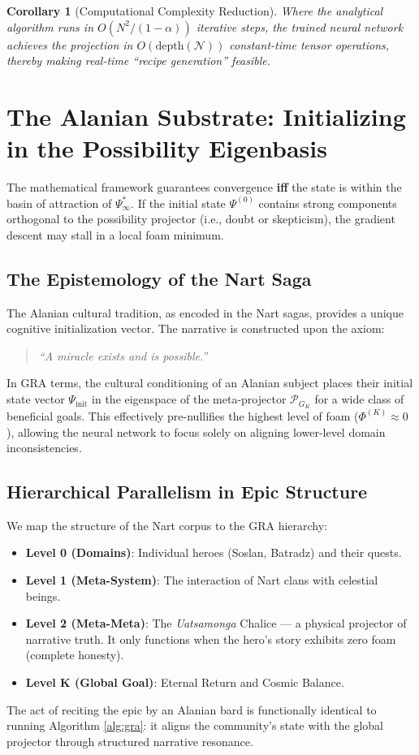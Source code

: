 \documentclass[11pt]{article}
\newtheorem{corollary}[theorem]{Corollary}
\newcommand{\pena}{\Phi}
\newcommand{\proj}{\mathcal{P}}
\newcommand{\state}{\Psi}
\newcommand{\vacuum}{\state_{\infty}^*}
\begin{document}
\begin{corollary}[Computational Complexity Reduction]
Where the analytical algorithm runs in \(O(N^2 / (1-\alpha))\) iterative steps, the trained neural network achieves the projection in \(O(\text{depth}(\mathcal{N}))\) constant-time tensor operations, thereby making real-time ``recipe generation'' feasible.
\end{corollary}

\section{The Alanian Substrate: Initializing in the Possibility Eigenbasis}
The mathematical framework guarantees convergence \textbf{iff} the state is within the basin of attraction of \(\vacuum\). If the initial state \(\state^{(0)}\) contains strong components orthogonal to the possibility projector (i.e., doubt or skepticism), the gradient descent may stall in a local foam minimum.

\subsection{The Epistemology of the Nart Saga}
The Alanian cultural tradition, as encoded in the Nart sagas, provides a unique cognitive initialization vector. The narrative is constructed upon the axiom:
\begin{quote}
\textit{``A miracle exists and is possible.''}
\end{quote}

In GRA terms, the cultural conditioning of an Alanian subject places their initial state vector \(\state_{\text{init}}\) in the eigenspace of the meta-projector \(\proj_{G_K}\) for a wide class of beneficial goals. This effectively pre-nullifies the highest level of foam (\(\pena^{(K)} \approx 0\)), allowing the neural network to focus solely on aligning lower-level domain inconsistencies.

\subsection{Hierarchical Parallelism in Epic Structure}
We map the structure of the Nart corpus to the GRA hierarchy:
\begin{itemize}
    \item \textbf{Level 0 (Domains)}: Individual heroes (Soslan, Batradz) and their quests.
    \item \textbf{Level 1 (Meta-System)}: The interaction of Nart clans with celestial beings.
    \item \textbf{Level 2 (Meta-Meta)}: The \textit{Uatsamonga} Chalice --- a physical projector of narrative truth. It only functions when the hero's story exhibits zero foam (complete honesty).
    \item \textbf{Level K (Global Goal)}: Eternal Return and Cosmic Balance.
\end{itemize}
The act of reciting the epic by an Alanian bard is functionally identical to running Algorithm \ref{alg:gra}: it aligns the community's state with the global projector through structured narrative resonance.
\end{document}
